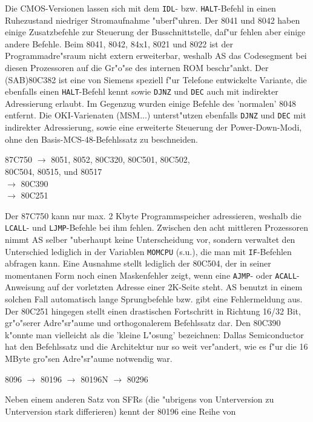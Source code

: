 \documentclass[12pt,a4paper,twoside]{report}
\newcommand{\tty}[1]{{\tt #1}}
\newcommand{\asname}{AS}
\begin{document}
Die CMOS-Versionen lassen
sich mit dem \tty{IDL}- bzw. \tty{HALT}-Befehl in einen Ruhezustand niedriger
Stromaufnahme "uberf"uhren.  Der 8041 und 8042 haben einige Zusatzbefehle zur
Steuerung der Busschnittstelle, daf"ur fehlen aber einige andere Befehle.
Beim 8041, 8042, 84x1, 8021 und 8022 ist der Programmadre"sraum nicht
extern erweiterbar, weshalb \asname{} das Codesegment bei diesen Prozessoren
auf die Gr"o"se des internen ROM beschr"ankt.  Der (SAB)80C382 ist eine von
Siemens speziell f"ur Telefone entwickelte Variante, die ebenfalls
einen \tty{HALT}-Befehl kennt sowie \tty{DJNZ} und \tty{DEC} auch
mit indirekter Adressierung erlaubt.  Im Gegenzug wurden einige
Befehle des 'normalen' 8048 entfernt. Die OKI-Varienaten (MSM...)
unterst"utzen ebenfalls \tty{DJNZ} und \tty{DEC} mit indirekter
Adressierung, sowie eine erweiterte Steuerung der
Power-Down-Modi, ohne den Basis-MCS-48-Befehlssatz zu
beschneiden.
\begin{cpulist}
   87C750 $\rightarrow$ 8051, 8052, 80C320, 80C501, 80C502, \\
\> 80C504, 80515, und 80517 \\
\> $\rightarrow$ 80C390 \\
\> $\rightarrow$ 80C251
\end{cpulist}
Der 87C750 kann nur max. 2 Kbyte Programmspeicher adressieren, weshalb
die \tty{LCALL}- und \tty{LJMP}-Befehle bei ihm fehlen.  Zwischen den
acht mittleren Prozessoren nimmt \asname{} selber "uberhaupt keine Unterscheidung
vor, sondern verwaltet den Unterschied lediglich in der Variablen
\tty{MOMCPU} (s.u.), die man mit \tty{IF}-Befehlen abfragen kann.  Eine
Ausnahme stellt lediglich der 80C504, der in seiner momentanen Form noch einen
Maskenfehler zeigt, wenn eine \tty{AJMP}- oder \tty{ACALL}-Anweisung auf der
vorletzten Adresse einer 2K-Seite steht.  \asname{} benutzt in einem solchen
Fall automatisch lange Sprungbefehle bzw. gibt eine Fehlermeldung aus.  Der
80C251 hingegen stellt einen drastischen Fortschritt in Richtung 16/32 Bit,
gr"o"serer Adre"sr"aume und orthogonalerem Befehlssatz dar.  Den 80C390
k"onnte man vielleicht als die 'kleine L"osung' bezeichnen:  Dallas
Semiconductor hat den Befehlssatz und die Architektur nur so weit
ver"andert, wie es f"ur die 16 MByte gro"sen Adre"sr"aume notwendig war.
\begin{cpulist}
   8096 $\rightarrow$ 80196 $\rightarrow$ 80196N $\rightarrow$ 80296
\end{cpulist}
Neben einem anderen Satz von SFRs (die "ubrigens von Unterversion zu
Unterversion stark differieren) kennt der 80196 eine Reihe von
\end{document}
